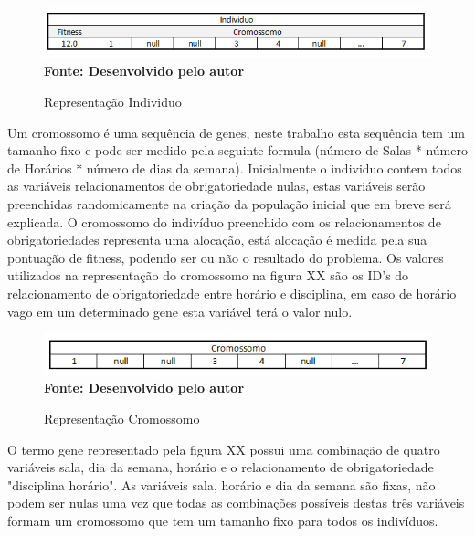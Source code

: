\documentclass{abntpuc}
\begin{document}
\begin{figure}[!htb]
\caption[Representação Individuo]{Representação Individuo}
\label{fig:figura7}
\centering
\includegraphics[scale=0.8]{imagens/representacaoIndividuo.png}
\\ \textbf{\footnotesize Fonte: Desenvolvido pelo autor}
\end{figure}

Um cromossomo é uma sequência de genes, neste trabalho esta sequência tem um tamanho fixo e pode ser medido pela seguinte formula (número de Salas * número de Horários * número de dias da semana). Inicialmente o individuo contem todos as variáveis relacionamentos de obrigatoriedade nulas, estas variáveis serão preenchidas randomicamente na criação da população inicial que em breve será explicada. O cromossomo do indivíduo preenchido com os relacionamentos de obrigatoriedades representa uma alocação, está alocação é medida pela sua pontuação de fitness, podendo ser ou não o resultado do problema. Os valores utilizados na representação do cromossomo na figura XX são os ID's do relacionamento de obrigatoriedade entre horário e disciplina, em caso de horário vago em um determinado gene esta variável terá o valor nulo.\par

\begin{figure}[!htb]
\caption[Representação Cromossomo]{Representação Cromossomo}
\label{fig:figura6}
\centering
\includegraphics[scale=0.9]{imagens/representacaoCromossomo.png}
\\ \textbf{\footnotesize Fonte: Desenvolvido pelo autor}
\end{figure}

O termo gene representado pela figura XX possui uma combinação de quatro variáveis sala, dia da semana, horário e o relacionamento de obrigatoriedade 
"disciplina horário". As variáveis sala, horário e dia da semana são fixas, não podem ser nulas uma vez que todas as combinações possíveis destas três variáveis formam um cromossomo que tem um tamanho fixo para todos os indivíduos. \par
\end{document}
